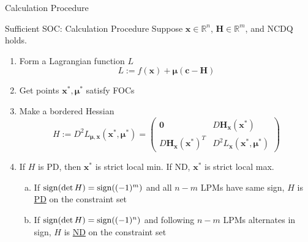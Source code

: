 \documentclass[final]{beamer}
\newcommand{\bb}{\mathbb}
\newcommand{\bd}{\mathbf}
\begin{document}
\begin{frame}[t]{Calculation Procedure}
	\begin{block}
		{Sufficient SOC: Calculation Procedure}
		Suppose $\bd{x}\in{\bb{R}^n}$, $\bd{H}\in\bb{R}^m$, and NCDQ holds.
		\begin{enumerate}
			\item Form a Lagrangian function $L$\[
				L:= f(\bd{x}) + \bd{\mu}(\bd{c}-\bd{H})
			\]
			\item Get points $\bd{x^\ast,\mu^\ast}$ satisfy FOCs
			\item Make a bordered Hessian\[
				H:=D^2L_{\bd{\mu,x}}(\bd{x^\ast,\mu^\ast})
				=\begin{pmatrix}
					\bd{0}&D\bd{H}_{\bd{x}}(\bd{x^\ast})\\
					D\bd{H}_{\bd{x}}(\bd{x^\ast})^T& D^2L_{\bd{x}}(\bd{x^\ast,\mu^\ast})
				\end{pmatrix}
			\]
			\item If $H$ is PD, then $\bd{x^\ast}$ is strict local min. If ND, $\bd{x^\ast}$ is strict local max.
			\begin{enumerate}[(a)]
				\item If ${\rm sign}(\det H)={\rm sign}((-1)^m)$ and all $n-m$ LPMs have same sign, $H$ is \uline{PD} on the constraint set
				\item If ${\rm sign}(\det H)={\rm sign}((-1)^n)$ and following $n-m$ LPMs alternates in sign, $H$ is \uline{ND} on the constraint set
			\end{enumerate}
		\end{enumerate}
	\end{block}
\end{frame}
\end{document}
